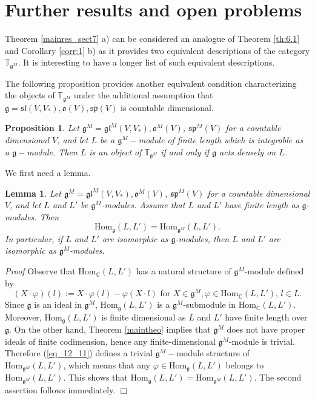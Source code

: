 \documentclass{svmult}
\newtheorem{lem}[theo]{Lemma}
\newtheorem{prop}[theo]{Proposition}
\renewenvironment{proof}{ \emph{Proof}}{$\Box$}
\newcommand{\TT}{\mathbb{T}}
\renewcommand{\sp}{\mathfrak{sp}}
\renewcommand{\sl}{\mathfrak{sl}}
\newcommand{\oo}{\mathfrak{o}}
\renewcommand{\gg}{\mathfrak{g}}
\renewcommand {\phi} {\varphi}
\newcommand{\gl}{\mathfrak{gl}}
\newcommand{\Hom}{\mathrm{Hom}}
\begin{document}
\section{Further results and open problems}\label{sect:8}

Theorem \ref{mainres_sect7} a) can be considered an analogue of Theorem \ref{th:6.1} and Corollary \ref{corr:1} b) as it provides two equivalent descriptions of the category $\TT_{\gg^M}$. It is interesting to have a longer list of such equivalent descriptions.

The following proposition provides another equivalent condition characterizing the objects of $\TT_{\gg^M}$ under the additional assumption that 
$\gg= \sl(V,V_*), \oo(V), \sp(V)$ is countable dimensional.


\begin{prop}\label{prop_sect8}
Let $\gg^M=\gl^M(V,V_*), \oo^M(V)$, $\sp^M(V)$ for a countable dimensional $V$, and let $L$ be a $\gg^M-$module of finite length which is integrable as a $\gg-$module. Then $L$ is an object of $\TT_{\gg^M}$ if and only if $\gg$ acts densely on $L$.
\end{prop}

We first need a lemma.

\begin{lem}\label{extension} Let $\gg^M=\gl^M(V,V_*), \oo^M(V)$, $\sp^M(V)$ for a countable dimensional $V$, and let $L$ and $L'$ be  
$\gg^M$-modules. 
Assume that $L$ and $L'$ have finite length as $\gg$-modules. Then 
$$\Hom_{\gg}(L,L')=\Hom_{\gg^M}(L,L').$$
In particular, if $L$ and $L'$ are isomorphic as $\gg$-modules, then $L$ and $L'$ are isomorphic as $\gg^M$-modules. 
\end{lem}

\begin{proof} Observe that $\Hom_{\mathbb C}(L,L')$ has a natural structure of $\gg^M$-module defined by
\begin{equation}\label{eq_12_11}
(X\cdot \varphi)(l):=X\cdot\varphi(l)-\varphi (X\cdot l)\,\,\text{for}\,\, X\in\gg^M, \varphi\in \Hom_{\mathbb C}(L,L'),\,l\in L. 
\end{equation}
Since $\gg$ is an ideal in $\gg^M$, $\Hom_{\gg}(L,L')$ is a $\gg^M$-submodule in $\Hom_{\mathbb C}(L,L')$. Moreover, $\Hom_{\gg}(L,L')$ is finite dimensional as $L$ and $L'$ have finite length over $\gg$. On the other hand, Theorem \ref{maintheo} implies that $\gg^M$ does not have proper ideals of finite codimension, hence any finite-dimensional $\gg^M$-module is trivial. Therefore (\ref{eq_12_11}) defines a trivial $\gg^M-$module structure of $\Hom_{\gg^M}(L,L')$, which means that any $\phi \in \Hom_\gg(L,L')$ belongs to $\Hom_{\gg^M}(L,L')$. This shows that $\Hom_{\gg}(L,L')=\Hom_{\gg^M}(L,L')$.
The second assertion follows immediately.
\end{proof}
\end{document}
